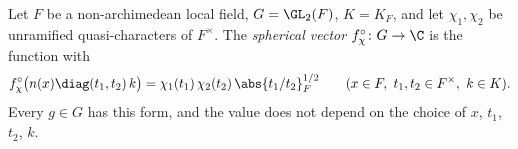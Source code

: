 Let $F$ be a non-archimedean local field, $G=\GL_2(F)$, $K=K_F$, and let $\chi_1,\chi_2$ be unramified
quasi-characters of $F^\times$. The \emph{spherical vector} $f^\circ_\chi\colon G\to\C$ is the function with
\[
  f^\circ_\chi\bigl(n(x)\diag(t_1,t_2)\,k\bigr)=\chi_1(t_1)\,\chi_2(t_2)\,\abs{t_1/t_2}_F^{1/2}
  \qquad(x\in F,\ t_1,t_2\in F^\times,\ k\in K).
\]
Every $g\in G$ has this form, and the value does not depend on the choice of $x$, $t_1$, $t_2$, $k$.
